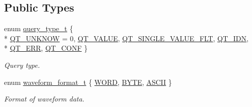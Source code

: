 \subsection*{Public Types}
\begin{DoxyCompactItemize}
\item 
enum \hyperlink{classmdt_frame_codec_scpi_a2dbce7589140e915f3e253c3523b3b9a}{query\-\_\-type\-\_\-t} \{ \\*
\hyperlink{classmdt_frame_codec_scpi_a2dbce7589140e915f3e253c3523b3b9aa80aaf6e25ad52710c5f61c6d734a0897}{Q\-T\-\_\-\-U\-N\-K\-N\-O\-W} = 0, 
\hyperlink{classmdt_frame_codec_scpi_a2dbce7589140e915f3e253c3523b3b9aae429676cb0129c2cb9179baf00d7e082}{Q\-T\-\_\-\-V\-A\-L\-U\-E}, 
\hyperlink{classmdt_frame_codec_scpi_a2dbce7589140e915f3e253c3523b3b9aa0f4f3edfd4d8b84dcbbff566de1278df}{Q\-T\-\_\-\-S\-I\-N\-G\-L\-E\-\_\-\-V\-A\-L\-U\-E\-\_\-\-F\-L\-T}, 
\hyperlink{classmdt_frame_codec_scpi_a2dbce7589140e915f3e253c3523b3b9aa889641e5713b59c1d91a9cc607745bc9}{Q\-T\-\_\-\-I\-D\-N}, 
\\*
\hyperlink{classmdt_frame_codec_scpi_a2dbce7589140e915f3e253c3523b3b9aa6e1b9ed9dff72df39e3b3fc88611e4a5}{Q\-T\-\_\-\-E\-R\-R}, 
\hyperlink{classmdt_frame_codec_scpi_a2dbce7589140e915f3e253c3523b3b9aa3df0e44b2eeacfad6f93ac9201db101d}{Q\-T\-\_\-\-C\-O\-N\-F}
 \}
\begin{DoxyCompactList}\small\item\em Query type. \end{DoxyCompactList}\item 
enum \hyperlink{classmdt_frame_codec_scpi_a0562eccf33d8cf62e7a73a748a70c475}{waveform\-\_\-format\-\_\-t} \{ \hyperlink{classmdt_frame_codec_scpi_a0562eccf33d8cf62e7a73a748a70c475a7f4b47afe74504dea43bb04c8c6fbe58}{W\-O\-R\-D}, 
\hyperlink{classmdt_frame_codec_scpi_a0562eccf33d8cf62e7a73a748a70c475aad91226f87cea7fab38f5cc7618f424c}{B\-Y\-T\-E}, 
\hyperlink{classmdt_frame_codec_scpi_a0562eccf33d8cf62e7a73a748a70c475a957445cd510a5c4e6964e9b79e73af4d}{A\-S\-C\-I\-I}
 \}
\begin{DoxyCompactList}\small\item\em Format of waveform data. \end{DoxyCompactList}\end{DoxyCompactItemize}
